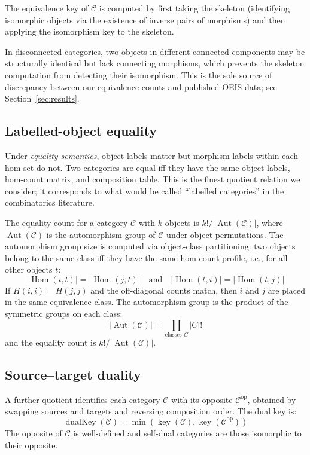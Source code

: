 \documentclass[12pt,a4paper]{amsart}
\theoremstyle{definition}
\theoremstyle{remark}
\newcommand{\cat}{\mathcal}
\newcommand{\op}{\mathrm{op}}
\newcommand{\Hom}{\operatorname{Hom}}
\newcommand{\Aut}{\operatorname{Aut}}
\begin{document}
The equivalence key of $\cat{C}$ is computed by first taking the skeleton
(identifying isomorphic objects via the existence of inverse pairs of
morphisms) and then applying the isomorphism key to the skeleton.

In disconnected categories, two objects in different connected components
may be structurally identical but lack connecting morphisms, which
prevents the skeleton computation from detecting their isomorphism.
This is the sole source of discrepancy between our equivalence counts and
published OEIS data; see Section~\ref{sec:results}.

\subsection{Labelled-object equality}

Under \emph{equality semantics}, object labels matter but morphism labels
within each hom-set do not.  Two categories are equal iff they have the
same object labels, hom-count matrix, and composition table.  This is the
finest quotient relation we consider; it corresponds to what would be
called ``labelled categories'' in the combinatorics literature.

The equality count for a category $\cat{C}$ with $k$ objects is
$k! / |\Aut(\cat{C})|$, where $\Aut(\cat{C})$ is the automorphism group
of $\cat{C}$ under object permutations.  The automorphism group size is
computed via object-class partitioning: two objects belong to the same
class iff they have the same hom-count profile, i.e., for all other
objects $t$:
\[
|\Hom(i,t)| = |\Hom(j,t)| \quad\text{and}\quad |\Hom(t,i)| = |\Hom(t,j)|
\]
If $H(i,i) = H(j,j)$ and the off-diagonal counts match, then $i$ and $j$
are placed in the same equivalence class.  The automorphism group is the
product of the symmetric groups on each class:
\[
|\Aut(\cat{C})| = \prod_{\text{classes } C} |C|!
\]
and the equality count is $k! / |\Aut(\cat{C})|$.

\subsection{Source--target duality}

A further quotient identifies each category $\cat{C}$ with its opposite
$\cat{C}^{\op}$, obtained by swapping sources and targets and reversing
composition order.  The dual key is:
\[
\operatorname{dualKey}(\cat{C}) = \min(\operatorname{key}(\cat{C}),
\operatorname{key}(\cat{C}^{\op}))
\]
The opposite of $\cat{C}$ is well-defined and self-dual categories are
those isomorphic to their opposite.
\end{document}
